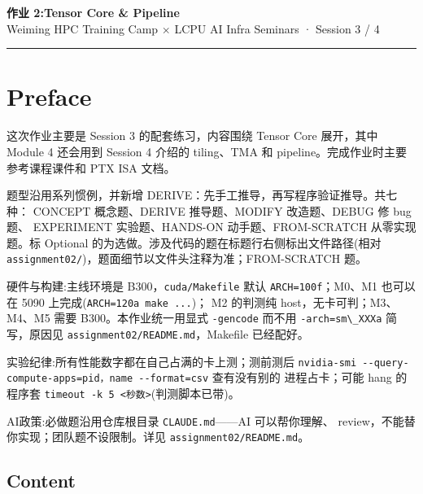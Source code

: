 \documentclass[11pt,a4paper,fontset=none]{ctexart}
\providecommand{\passthrough}[1]{#1}
\begin{document}
\begin{center}
  {\LARGE\bfseries 作业 2:Tensor Core \& Pipeline}\\[6pt]
  {\sffamily Weiming HPC Training Camp \(\times\) LCPU AI Infra Seminars
· Session 3 / 4}
\end{center}

\vspace{0.5em}
\hrule
\vspace{1em}

\setcounter{section}{-1}

\hypertarget{preface}{%
\section*{Preface}\label{preface}}

这次作业主要是 Session 3 的配套练习，内容围绕 Tensor Core 展开，其中
Module 4 还会用到 Session 4 介绍的 tiling、TMA 和
pipeline。完成作业时主要参考课程课件和 PTX ISA 文档。

题型沿用系列惯例，并新增 DERIVE：先手工推导，再写程序验证推导。共七种：
CONCEPT 概念题、DERIVE 推导题、MODIFY 改造题、DEBUG 修 bug 题、
EXPERIMENT 实验题、HANDS-ON 动手题、FROM-SCRATCH 从零实现题。标 Optional
的为选做。涉及代码的题在标题行右侧标出文件路径(相对
\passthrough{\lstinline!assignment02/!})，题面细节以文件头注释为准；FROM-SCRATCH
题。

硬件与构建:主线环境是 B300，\passthrough{\lstinline!cuda/Makefile!} 默认
\passthrough{\lstinline!ARCH=100f!}；M0、M1 也可以在 5090
上完成(\passthrough{\lstinline!ARCH=120a make ...!})； M2 的判测纯
host，无卡可判；M3、M4、M5 需要 B300。本作业统一用显式
\passthrough{\lstinline!-gencode!} 而不用
\passthrough{\lstinline!-arch=sm\_XXXa!} 简写，原因见
\passthrough{\lstinline!assignment02/README.md!}，Makefile 已经配好。

实验纪律:所有性能数字都在自己占满的卡上测；测前测后
\passthrough{\lstinline!nvidia-smi --query-compute-apps=pid，name --format=csv!}
查有没有别的 进程占卡；可能 hang 的程序套
\passthrough{\lstinline!timeout -k 5 <秒数>!}(判测脚本已带)。

AI政策:必做题沿用仓库根目录 \passthrough{\lstinline!CLAUDE.md!}------AI
可以帮你理解、 review，不能替你实现；团队题不设限制。详见
\passthrough{\lstinline!assignment02/README.md!}。

\hypertarget{content}{%
\subsection*{Content}\label{content}}
\end{document}
